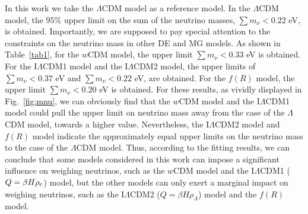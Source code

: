 \documentclass[aps,prd,nofootinbib,amsmath,amssymb,twocolumn,superscriptaddress,10pt]{revtex4}%
\newcommand{\update}[1]{\textcolor{purple}{#1}}
\begin{document}
{In this work we take the $\Lambda$CDM model as a reference model. In the $\Lambda$CDM model, the 95\% upper limit on the sum of the neutrino masses, $\sum m_{\nu}<0.22$ eV, is obtained.
Importantly, we are supposed to pay special attention to the constraints on the neutrino mass in other DE and MG models. As shown in Table~\ref{tab1}, for the $w$CDM model, the upper limit $\sum m_{\nu}<0.33$ eV is obtained. For the I$\Lambda$CDM1 model and the I$\Lambda$CDM2 model, the upper limits of $\sum m_{\nu}<0.37$ eV and $\sum m_{\nu}<0.22$ eV, are obtained. For the $f(R)$ model, the upper limit $\sum m_{\nu}<0.20$ eV is obtained. For these results, as vividly displayed in Fig.~\ref{fig:mnu}, we can obviously find that the $w$CDM model and the I$\Lambda$CDM1 model could pull the upper limit on neutrino mass away from the case of the $\Lambda$CDM model, towards a higher value. Nevertheless, the I$\Lambda$CDM2 model and $f(R)$ model indicate the approximately equal upper limits on the neutrino mass to the case of the $\Lambda$CDM model. Thus, according to the fitting results, we can conclude that some models considered in this work can impose a significant influence on weighing neutrinos, such as the $w$CDM model and the I$\Lambda$CDM1 ($Q=\beta H\rho_{\rm c}$) model, but the other models can only exert a marginal impact on weighing neutrinos, such as the I$\Lambda$CDM2 ($Q=\beta H\rho_{\Lambda}$) model and the $f(R)$ model.}



\end{document}
